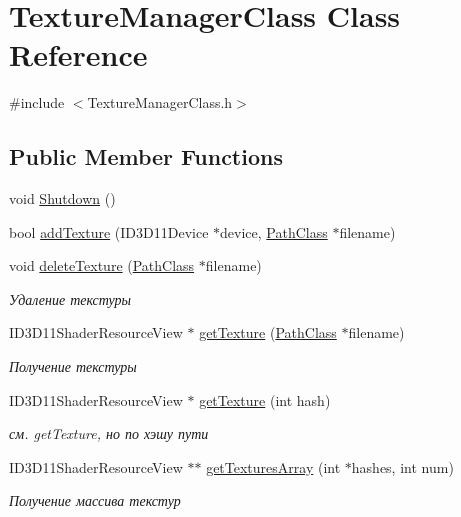\hypertarget{class_texture_manager_class}{}\section{Texture\+Manager\+Class Class Reference}
\label{class_texture_manager_class}


{\ttfamily \#include $<$Texture\+Manager\+Class.\+h$>$}

\subsection*{Public Member Functions}
\begin{DoxyCompactItemize}
\item 
void \hyperlink{class_texture_manager_class_a149a4d05485cac1140ba30da5dc3efba}{Shutdown} ()
\item 
bool \hyperlink{class_texture_manager_class_a08a1f9a02ba20c2c688366b29a7fcaf9}{add\+Texture} (I\+D3\+D11\+Device $\ast$device, \hyperlink{class_path_class}{Path\+Class} $\ast$filename)
\item 
void \hyperlink{class_texture_manager_class_a8d923c6275b750bdad183521895b02a3}{delete\+Texture} (\hyperlink{class_path_class}{Path\+Class} $\ast$filename)
\begin{DoxyCompactList}\small\item\em Удаление текстуры \end{DoxyCompactList}\item 
I\+D3\+D11\+Shader\+Resource\+View $\ast$ \hyperlink{class_texture_manager_class_a902cc8c96b5fc09937854a36944b93f9}{get\+Texture} (\hyperlink{class_path_class}{Path\+Class} $\ast$filename)
\begin{DoxyCompactList}\small\item\em Получение текстуры \end{DoxyCompactList}\item 
I\+D3\+D11\+Shader\+Resource\+View $\ast$ \hyperlink{class_texture_manager_class_a6f9486a1e45246aef031533b2d4ea456}{get\+Texture} (int hash)
\begin{DoxyCompactList}\small\item\em см. get\+Texture, но по хэшу пути \end{DoxyCompactList}\item 
I\+D3\+D11\+Shader\+Resource\+View $\ast$$\ast$ \hyperlink{class_texture_manager_class_ab0d1f5332078c19ccb63bcd9360706d3}{get\+Textures\+Array} (int $\ast$hashes, int num)
\begin{DoxyCompactList}\small\item\em Получение массива текстур \end{DoxyCompactList}\end{DoxyCompactItemize}
